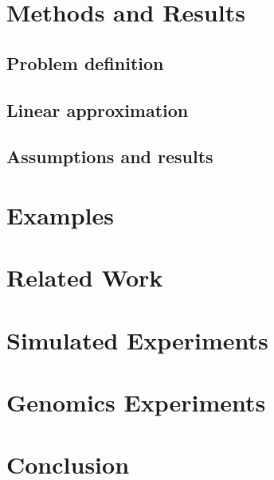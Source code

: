 \documentclass{article}
\begin{document}
\section{Methods and Results}\label{sec:methods}

\subsection{Problem definition}\label{subsec:problem_definition}


\subsection{Linear approximation}


\subsection{Assumptions and results}\label{subsec:assumptions}



\section{Examples}\label{sec:methods_examples}



\section{Related Work}\label{sec:relatedwork}



\section{Simulated Experiments}



\section{Genomics Experiments\label{sec:genomics}}



\section{Conclusion}


\newpage

\end{document}
